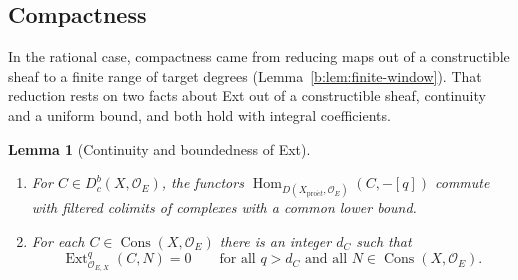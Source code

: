 \documentclass[11pt,a4paper]{article}
\numberwithin{equation}{section}
\newtheorem{lemma}[theorem]{Lemma}
\theoremstyle{definition}
\theoremstyle{remark}
\newcommand{\Dbc}{D^b_c}
\newcommand{\proet}{\mathrm{pro}\acute{e}t}
\newcommand{\Hom}{\operatorname{Hom}}
\newcommand{\Ext}{\operatorname{Ext}}
\newcommand{\Cons}{\operatorname{Cons}}
\begin{document}
\subsection{Compactness}
In the rational case, compactness came from reducing maps out of a
constructible sheaf to a finite range of target degrees
(Lemma~\ref{b:lem:finite-window}). That reduction rests on two facts
about Ext out of a constructible sheaf, continuity and a uniform bound,
and both hold with integral coefficients.

\begin{lemma}[Continuity and boundedness of Ext]
\label{i:ext}
\leavevmode
\begin{enumerate}
\item For $C\in \Dbc(X,\mathcal O_E)$, the functors
  $\Hom_{D(X_{\proet},\mathcal O_E)}(C,-[q])$ commute
  with filtered colimits of complexes with a common lower bound.
\item For each $C\in\Cons(X,\mathcal O_E)$ there is an integer $d_C$ such
  that
  \[
   \Ext^q_{\mathcal O_{E,X}}(C,N)=0
   \qquad\text{for all }q>d_C\text{ and all }N\in\Cons(X,\mathcal O_E).
  \]
\end{enumerate}
\end{lemma}
\end{document}

